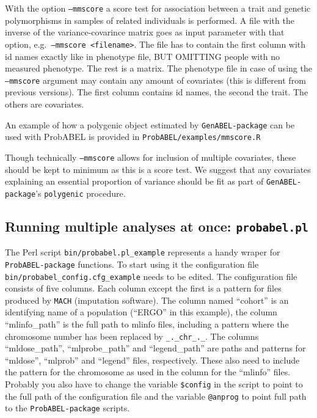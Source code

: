 \documentclass[12pt,a4paper]{article}
\newcommand{\PA}{\texttt{ProbABEL-package}}
\newcommand{\GA}{\texttt{GenABEL-package}}
\begin{document}
With the option \texttt{--mmscore} a score test for association
between a trait and genetic polymorphisms in samples of related
individuals is performed. A file with the inverse of the
variance-covarince matrix goes as input parameter with that option,
e.g.~\texttt{--mmscore <filename>}. The file has to contain the first
column with id names exactly like in phenotype file, BUT OMITTING
people with no measured phenotype. The rest is a matrix. The phenotype
file in case of using the \texttt{--mmscore} argument may contain any
amount of covariates (this is different from previous versions). The
first column contains id names, the second the trait. The others are
covariates.

An example of how a polygenic object estimated by \GA{} can be used
with ProbABEL is provided in \texttt{ProbABEL/examples/mmscore.R}

Though technically \texttt{--mmscore} allows for inclusion of multiple
covariates, these should be kept to minimum as this is a score test. We
suggest that any covariates explaining an essential proportion of
variance should be fit as part of \GA{}'s
\texttt{polygenic} procedure.


\subsection{Running multiple analyses at once: \texttt{probabel.pl}}

The Perl script \texttt{bin/probabel.pl\_example} represents a handy
wraper for \PA{} functions.  To start using it the
configuration file \texttt{bin/probabel\_config.cfg\_example} needs to
be edited. The configuration file consists of five columns. Each
column except the first is a pattern for files produced by
\texttt{MACH} (imputation software). The column named ``cohort'' is an
identifying name of a population (``ERGO'' in this example), the
column ``mlinfo\_path'' is the full path to mlinfo files, including a
pattern where the chromosome number has been replaced by
\texttt{\_.\_chr\_.\_}. The columns ``mldose\_path'',
``mlprobe\_path'' and ``legend\_path'' are paths and patterns for
``mldose'', ``mlprob'' and ``legend'' files, respectively. These also
need to include the pattern for the chromosome as used in the column
for the ``mlinfo'' files. Probably you also have to change the variable
\texttt{\$config} in the script to point to the full path of the
configuration file and the variable \texttt{@anprog} to point full
path to the \PA{} scripts.
\end{document}

